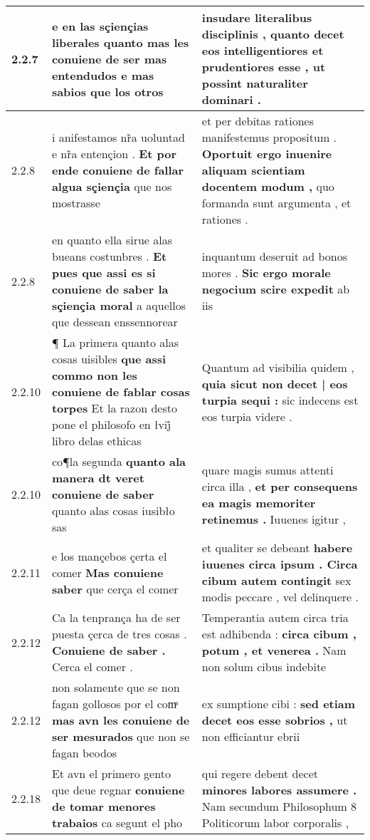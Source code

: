 \begin{tabular}{|p{1cm}|p{6.5cm}|p{6.5cm}|}
2.2.7 & e en las sçiençias liberales \textbf{ quanto mas les conuiene de ser mas entendudos } e mas sabios que los otros & insudare literalibus disciplinis , \textbf{ quanto decet eos intelligentiores et prudentiores esse , } ut possint naturaliter dominari . \\\hline
2.2.8 & i anifestamos nr̃a uoluntad e nr̃a entençion . \textbf{ Et por ende conuiene de fallar algua sçiençia } que nos mostrasse & et per debitas rationes manifestemus propositum . \textbf{ Oportuit ergo inuenire aliquam scientiam docentem modum , } quo formanda sunt argumenta , et rationes . \\\hline
2.2.8 & en quanto ella sirue alas bueans costunbres . \textbf{ Et pues que assi es si conuiene de saber la sçiençia moral } a aquellos que dessean enssennorear & inquantum deseruit ad bonos mores . \textbf{ Sic ergo morale negocium scire expedit } ab iis \\\hline
2.2.10 & ¶ La primera quanto alas cosas uisibles \textbf{ que assi commo non les conuiene de fablar cosas torpes } Et la razon desto pone el philosofo en łvij̊ libro delas ethicas & Quantum ad visibilia quidem , \textbf{ quia sicut non decet | eos turpia sequi : } sic indecens est eos turpia videre . \\\hline
2.2.10 & co¶la segunda \textbf{ quanto ala manera dt veret conuiene de saber } quanto alas cosas iusibło sas & quare magis sumus attenti circa illa , \textbf{ et per consequens ea magis memoriter retinemus . } Iuuenes igitur , \\\hline
2.2.11 & e los mançebos çerta el comer \textbf{ Mas conuiene saber } que cerça el comer & et qualiter se debeant \textbf{ habere iuuenes circa ipsum . Circa cibum autem contingit } sex modis peccare , vel delinquere . \\\hline
2.2.12 & Ca la tenprança ha de ser puesta çerca de tres cosas . \textbf{ Conuiene de saber . } Cerca el comer . & Temperantia autem circa tria est adhibenda : \textbf{ circa cibum , potum , et venerea . } Nam non solum cibus indebite \\\hline
2.2.12 & non solamente que se non fagan gollosos por el comͣ \textbf{ mas avn les conuiene de ser mesurados } que non se fagan beodos & ex sumptione cibi : \textbf{ sed etiam decet eos esse sobrios , } ut non efficiantur ebrii \\\hline
2.2.18 & Et avn el primero gento que deue regnar \textbf{ conuiene de tomar menores trabaios } ca segunt el pho & qui regere debent decet \textbf{ minores labores assumere . } Nam secundum Philosophum 8 Politicorum labor corporalis , \\\hline

\end{tabular}
